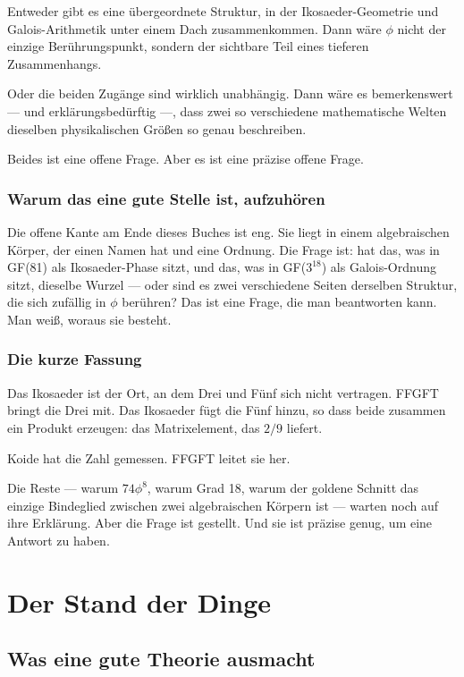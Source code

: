 \documentclass[12pt,oneside]{book}
\begin{document}
Entweder gibt es eine übergeordnete Struktur, in der Ikosaeder-Geometrie und Galois-Arithmetik unter einem Dach zusammenkommen. Dann wäre $\phi$ nicht der einzige Berührungspunkt, sondern der sichtbare Teil eines tieferen Zusammenhangs.

Oder die beiden Zugänge sind wirklich unabhängig. Dann wäre es bemerkenswert — und erklärungsbedürftig —, dass zwei so verschiedene mathematische Welten dieselben physikalischen Größen so genau beschreiben.

Beides ist eine offene Frage. Aber es ist eine präzise offene Frage.

\section{Warum das eine gute Stelle ist, aufzuhören}

Die offene Kante am Ende dieses Buches ist eng. Sie liegt in einem algebraischen Körper, der einen Namen hat und eine Ordnung. Die Frage ist: hat das, was in GF(81) als Ikosaeder-Phase sitzt, und das, was in GF($3^{18}$) als Galois-Ordnung sitzt, dieselbe Wurzel — oder sind es zwei verschiedene Seiten derselben Struktur, die sich zufällig in $\phi$ berühren? Das ist eine Frage, die man beantworten kann. Man weiß, woraus sie besteht.

\section{Die kurze Fassung}

Das Ikosaeder ist der Ort, an dem Drei und Fünf sich nicht vertragen. FFGFT bringt die Drei mit. Das Ikosaeder fügt die Fünf hinzu, so dass beide zusammen ein Produkt erzeugen: das Matrixelement, das $2/9$ liefert.

Koide hat die Zahl gemessen. FFGFT leitet sie her.

Die Reste — warum $74\phi^8$, warum Grad 18, warum der goldene Schnitt das einzige Bindeglied zwischen zwei algebraischen Körpern ist — warten noch auf ihre Erklärung. Aber die Frage ist gestellt. Und sie ist präzise genug, um eine Antwort zu haben.

\part{Der Stand der Dinge}

\chapter{Was eine gute Theorie ausmacht}
\end{document}
